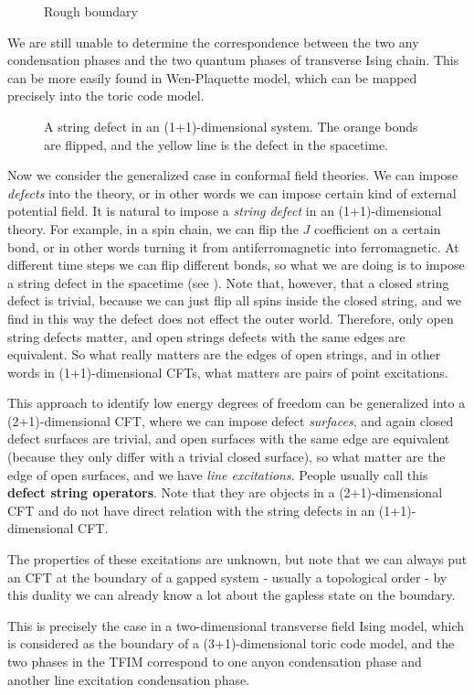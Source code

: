 \documentclass[hyperref, a4paper]{article}
\newcommand*{\concept}[1]{{\textbf{#1}}}
\begin{document}
\begin{figure}
    \centering
    
    \caption{Rough boundary}
    \label{fig:rough}
\end{figure}

We are still unable to determine the correspondence between the two any condensation phases and the two quantum
phases of transverse Ising chain. This can be more easily found in Wen-Plaquette model, which can be mapped 
precisely into the toric code model. 

\begin{figure}
    \centering
    
    \caption{A string defect in an (1+1)-dimensional system. The orange bonds are flipped, and the yellow line is the defect in the spacetime.}
    \label{fig:defect-string-1d}
\end{figure}

Now we consider the generalized case in conformal field theories. We can impose \emph{defects} into the theory,
or in other words we can impose certain kind of external potential field. It is natural to impose a 
\emph{string defect} in an (1+1)-dimensional theory. For example, in a spin chain, we can flip the $J$ coefficient
on a certain bond, or in other words turning it from antiferromagnetic into ferromagnetic. At different 
time steps we can flip different bonds, so what we are doing is to impose a string defect in the spacetime 
(see ). Note that, however, that a closed string defect is trivial, because we can 
just flip all spins inside the closed string, and we find in this way the defect does not effect the outer world.
Therefore, only open string defects matter, and open strings defects with the same edges are equivalent. 
So what really matters are the edges of open strings, and in other words in (1+1)-dimensional CFTs, what matters
are pairs of point excitations.

This approach to identify low energy degrees of freedom can be generalized into a (2+1)-dimensional CFT, 
where we can impose defect \emph{surfaces}, and again closed defect surfaces are trivial, and open 
surfaces with the same edge are equivalent (because they only differ with a trivial closed surface), 
so what matter are the edge of open surfaces, and we have \emph{line excitations}. People usually call 
this \concept{defect string operators}. Note that they are objects in a (2+1)-dimensional CFT and do not 
have direct relation with the string defects in an (1+1)-dimensional CFT.

The properties of these excitations are unknown, but note that we can always put an CFT at the boundary of a 
gapped system - usually a topological order - by this duality we can already know a lot about the gapless 
state on the boundary.

This is precisely the case in a two-dimensional transverse field Ising model, which is considered as the boundary 
of a (3+1)-dimensional toric code model, and the two phases in the TFIM correspond to one anyon condensation phase 
and another line excitation condensation phase.  
\end{document}
